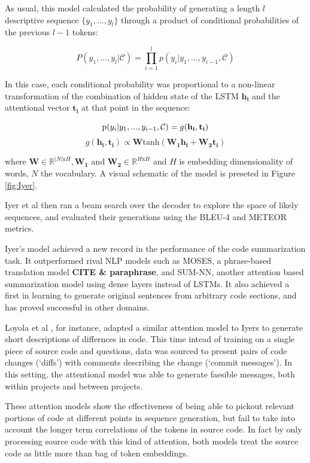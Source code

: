 As usual, this model calculated the probability of generating a length $l$
descriptive sequence $\{y_1,...,y_l\}$ through a product of conditional probabilities of the previous $l-1$ tokens:

$$P(y_1,...,y_l| \mathcal{C}) = \prod_{i=1}^lp(y_i | y_1, ..., y_{i-1}, \mathcal{C} ) $$

In this case, each conditional probability was proportional to a non-linear transformation of the combination of hidden state of the LSTM $\mathbf{h_i}$ and the attentional vector  $\mathbf{t_i}$ at that point in the sequence: 

$$\text p(y_i | y_1, ..., y_{i-1},\mathcal{C} ) = g(\mathbf{h_i}, \mathbf{t_i}) $$
$$g(\mathbf{h_i}, \mathbf{t_i})  \propto \mathbf{W}\text{tanh}(\mathbf{W_1h_i} + \mathbf{W_2t_i})$$

where $\mathbf{W} \in \mathbb{R}^{|N|\text{x} H}, \mathbf{W_1}$ and $\mathbf{W_2} \in \mathbb{R}^{H \text{x} H}$  and $ H$ is embedding dimensionality of words, $ N $ the vocabulary.\cite{iyer_summarizing_2016}
A visual schematic of the model is preseted in Figure \ref{fig:Iyer}.

Iyer et al then ran a beam search over the decoder to explore the space of likely sequences, and evaluated their generations using the BLEU-4 and METEOR metrics.

Iyer's model achieved a new record in the performance of the code summarization task. 
It outperformed rival NLP models such as MOSES, a phrase-based translation model \textbf{CITE \& paraphrase}, and SUM-NN, another attention based summarization model using dense layers instead of LSTMs. 
It also achieved a first in learning to generate original sentences from arbitrary code sections, and has proved successful in other domains.  

Loyola et al \cite{loyola_neural_2017}, for instance, adapted a similar attention model to Iyers to generate short descriptions of differnces in code.
This time intead of training on a single piece of source code and questions, data was sourced to present pairs of code changes (`diffs') with comments describing the change (`commit messages'). 
In this setting, the attentional model was able to generate faesible messages, both within projects and between projects.

These attention models show the effectiveness of being able to pickout relevant portions of code at different points in sequence generation, but fail to take into account the longer term correlations of the tokens in source code. In fact by only processing source code with this kind of attention, both models treat the source code as little more than bag of token embeddings.

